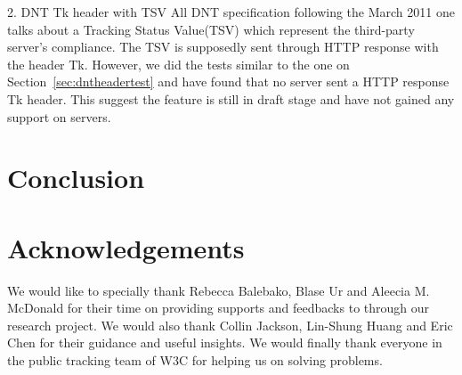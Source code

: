 \documentclass{sig-alternate}
\begin{document}
2. DNT Tk header with TSV
  All DNT specification following the March 2011 one talks about a Tracking Status Value(TSV) which represent the third-party server’s compliance. The TSV is supposedly sent through HTTP response with the header Tk. However, we did the tests similar to the one on Section~\ref{sec:dntheadertest} and have found that no server sent a HTTP response Tk header. This suggest the feature is still in draft stage and have not gained any support on servers. 


\section{Conclusion} \label{sec:conclusion}

\section*{Acknowledgements}

We would like to specially thank Rebecca Balebako, Blase Ur and Aleecia M. McDonald for their time on providing supports and feedbacks to through our research project. We would also thank Collin Jackson, Lin-Shung Huang and Eric Chen for their guidance and useful insights. We would finally thank everyone in the public tracking team of W3C for helping us on solving problems.


\end{document}
